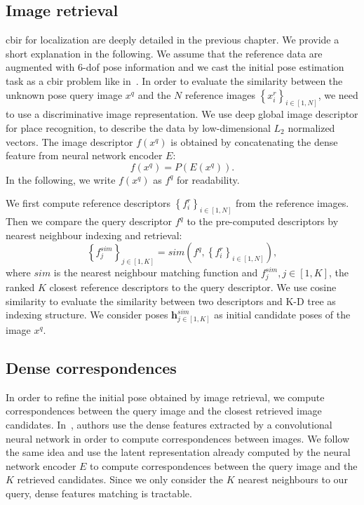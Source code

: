 \subsection{Image retrieval}
\label{subsec:image_indexing}
\Ac{cbir} for localization are deeply detailed in the previous chapter. We provide a short explanation in the following.  We assume that the reference data are augmented with 6-\ac{dof} pose information and we cast the initial pose estimation task as a \ac{cbir} problem like in~\cite{Balntas2018}. In order to evaluate the similarity between the unknown pose query image $x^q$ and the $N$ reference images $\left\{ x_{i}^r \right\}_{i\in\left[1,N\right]}$, we need to use a discriminative image representation. We use deep global image descriptor for place recognition, to describe the data by low-dimensional $L_2$ normalized vectors. The image descriptor $f(x^q) $ is obtained by concatenating the dense feature from neural network encoder $E$: 
\begin{equation}
	f(x^q) = P(E(x^q)).
\end{equation}
\noindent In the following, we write $f(x^q)$ as $f^q$ for readability.

We first compute reference descriptors $\left\{ f_{i}^r \right\}_{i\in\left[1,N\right]}$ from the reference images. Then we compare the query descriptor $f^q$ to the pre-computed descriptors by nearest neighbour indexing and retrieval:
\begin{equation}
	\left\{ f^{sim}_j \right\}_{j\in\left[1, K\right]} = sim \left( f^q, \left\{ f^r_i\right\}_{i\in\left[1,N\right]} \right),
\end{equation}
where $sim$ is the nearest neighbour matching function and $f^{sim}_j, j \in [1, K]$, the ranked $K$ closest reference descriptors to the query descriptor. We use cosine similarity to evaluate the similarity between two descriptors and K-D tree as indexing structure. We consider poses $\mathbf{h}^{sim}_{j \in [1, K]}$ as initial candidate poses of the image $x^q$.

\subsection{Dense correspondences}
\label{subsec:matching}
In order to refine the initial pose obtained by image retrieval, we compute correspondences between the query image and the closest retrieved image candidates. In~\citep{Taira2018, Noh2017, Widya2018}, authors use the dense features extracted by a convolutional neural network in order to compute correspondences between images. We follow the same idea and use the latent representation already computed by the neural network encoder $E$ to compute correspondences between the query image and the $K$ retrieved candidates. Since we only consider the $K$ nearest neighbours to our query, dense features matching is tractable.

